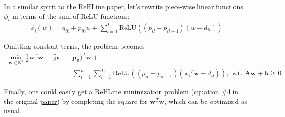 \documentclass{article}
\newcommand{\R}{\mathbb{R}}
\begin{document}
In a similar spirit to the ReHLine paper, let's rewrite piece-wise linear functions $\phi_i$ in terms of the sum of ReLU functions:
\begin{align*}
\phi_i(w) = q_{i0} + p_{i0}w + \sum_{l=1}^{L_i} \text{ReLU}((p_{il}-p_{il-1})(w-d_{il}))
\end{align*}

Omitting constant terms, the problem becomes
\begin{align*}
\min_{\mathbf{w} \in \R^n} \frac{1}{2} \mathbf{w}^T \mathbf{w} - (\mathbf{\tilde{\mu}}- & \mathbf{p_0})^T \mathbf{w} + \\ & \sum_{i=1}^n \sum_{l=1}^{L_i} \text{ReLU}((p_{il} - p_{il-1})(\mathbf{x_i}^T \mathbf{w} - d_{il})), \;\; \text{s.t. } \mathbf{\tilde{A}w} + \mathbf{b} \geq 0
\end{align*} 

Finally, one could easily get a ReHLine minimization problem (equation \#4 in the original \href{https://openreview.net/pdf?id=3pEBW2UPAD}{paper}) by completing the square for $\mathbf{w}^T \mathbf{w}$, which can be optimized as usual. 
\end{document}
